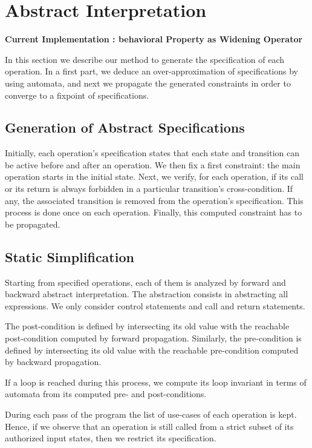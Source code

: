 \documentclass{frama-c-book}
\begin{document}
\section{Abstract Interpretation}
{\bf Current Implementation : behavioral Property as Widening Operator}

  In this section we describe our method to generate the specification of each
  operation. In a first part, we deduce an over-approximation of specifications
  by using automata, and next we propagate the generated constraints in order to
  converge to a fixpoint of specifications.

\subsection{Generation of Abstract Specifications}
Initially, each operation's specification states that each state and transition
can be active before and after an operation.
We then fix a first constraint: the main operation starts in the initial
state. Next, we verify, for each operation, if its call or its return is always
forbidden in a particular transition's cross-condition. If any, the associated
transition is removed from the operation's specification. This process is done
once on each operation. Finally, this computed constraint has to be propagated.

\subsection{Static Simplification}
Starting from specified operations, each of them is analyzed by forward and
backward abstract interpretation. The abstraction consists in abstracting all
expressions. We only consider control statements and call and return
statements.

The post-condition is defined by intersecting its old value with the reachable
post-condition computed by forward propagation. Similarly, the pre-condition is
defined by intersecting its old value with the reachable pre-condition computed
by backward propagation.

If a loop is reached during this process, we compute its loop invariant in
terms of automata from its computed pre- and post-conditions.

During each pass of the program the list of use-cases of each operation is
kept. Hence, if we observe that an operation is still called from a strict
subset of its authorized input states, then we restrict its specification.
\end{document}
